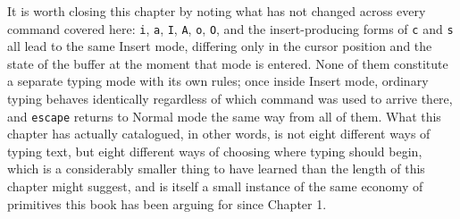 It is worth closing this chapter by noting what has not changed across every command covered here: \texttt{i}, \texttt{a}, \texttt{I}, \texttt{A}, \texttt{o}, \texttt{O}, and the insert-producing forms of \texttt{c} and \texttt{s} all lead to the same Insert mode, differing only in the cursor position and the state of the buffer at the moment that mode is entered. None of them constitute a separate typing mode with its own rules; once inside Insert mode, ordinary typing behaves identically regardless of which command was used to arrive there, and \texttt{escape} returns to Normal mode the same way from all of them. What this chapter has actually catalogued, in other words, is not eight different ways of typing text, but eight different ways of choosing where typing should begin, which is a considerably smaller thing to have learned than the length of this chapter might suggest, and is itself a small instance of the same economy of primitives this book has been arguing for since Chapter 1.

